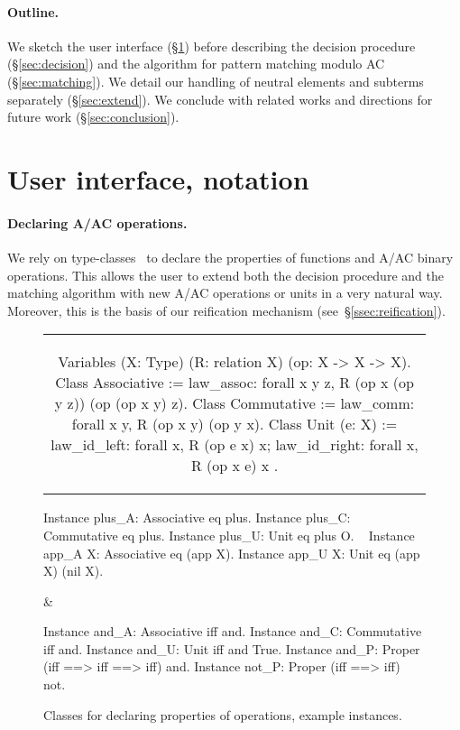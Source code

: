 \documentclass{llncs}
\begin{document}
\paragraph{Outline.}

We sketch the user interface (\S\ref{sec:overall}) before describing
the decision procedure (\S\ref{sec:decision}) and the algorithm for
pattern matching modulo AC (\S\ref{sec:matching}). We detail our
handling of neutral elements and subterms separately
(\S\ref{sec:extend}). We conclude with related works and directions
for future work (\S\ref{sec:conclusion}).


\section{User interface, notation}
\label{sec:overall}

\paragraph{Declaring A/AC operations.}

We rely on type-classes~\cite{SozeauOury08} to declare the properties
of functions and A/AC binary operations. This allows the user to
extend both the decision procedure and the matching algorithm with new
A/AC operations or units in a very natural way. Moreover, this is the
basis of our reification mechanism (see~\S\ref{ssec:reification}).

\begin{figure}[t]
\begin{tabular}{c}\begin{coq}
Variables (X: Type) (R: relation X) (op: X -> X -> X).
Class Associative := law_assoc: forall x y z, R (op x (op y z)) (op (op x y) z).
Class Commutative := law_comm: forall x y, R (op x y) (op y x).
Class Unit (e: X) := { law_id_left: forall x, R (op e x) x; law_id_right: forall x, R (op x e) x }.  
\end{coq}\end{tabular}
\smallskip
\begin{twolistings}
\begin{coq}
Instance plus_A: Associative eq plus.
Instance plus_C: Commutative eq plus.
Instance plus_U: Unit eq plus O.
~
Instance app_A X: Associative eq (app X).
Instance app_U X: Unit eq (app X) (nil X).
\end{coq}
&
\begin{coq}
Instance and_A: Associative iff and.
Instance and_C: Commutative iff and.
Instance and_U: Unit iff and True.
Instance and_P: Proper (iff ==> iff ==> iff) and. 
Instance not_P: Proper (iff ==> iff) not. 
~
\end{coq}
\end{twolistings}
\caption{Classes for declaring properties of operations, example instances.}
\label{fig:classes}
\end{figure}
\end{document}
